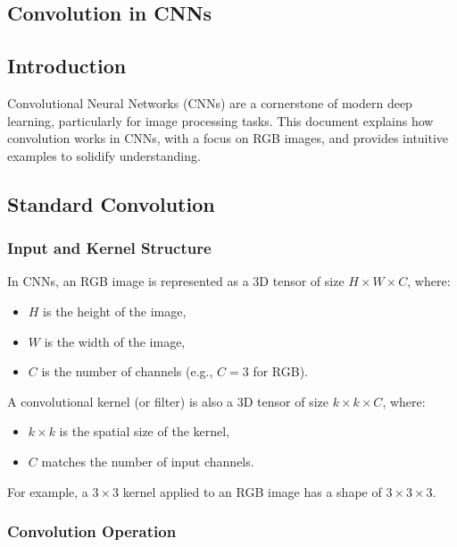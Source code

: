 \begin{notechapter}
\chapter{Convolution in CNNs}\label{ch:convolution-in-cnns}

\section{Introduction}

Convolutional Neural Networks (CNNs) are a cornerstone of modern deep 
learning, particularly for image processing tasks. This document 
explains how convolution works in CNNs, with a focus on RGB images, 
and provides intuitive examples to solidify understanding.

\section{Standard Convolution}

\subsection{Input and Kernel Structure}

In CNNs, an RGB image is represented as a 3D tensor of size 
\(H \times W \times C\), where:
\begin{itemize}
    \item \(H\) is the height of the image,
    \item \(W\) is the width of the image,
    \item \(C\) is the number of channels (e.g., \(C = 3\) for RGB).
\end{itemize}

A convolutional kernel (or filter) is also a 3D tensor of size 
\(k \times k \times C\), where:
\begin{itemize}
    \item \(k \times k\) is the spatial size of the kernel,
    \item \(C\) matches the number of input channels.
\end{itemize}

For example, a \(3 \times 3\) kernel applied to an RGB image has a 
shape of \(3 \times 3 \times 3\).

\subsection{Convolution Operation}


\end{notechapter}

